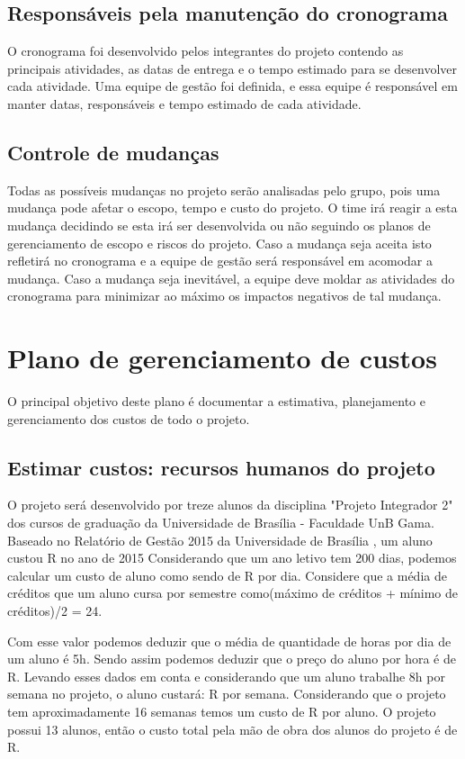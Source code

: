 \subsection{Responsáveis pela manutenção do cronograma}
O cronograma foi desenvolvido pelos integrantes do projeto contendo as principais atividades, as datas de entrega e o tempo estimado para se desenvolver cada atividade. Uma equipe de gestão foi definida, e essa equipe é responsável em manter datas, responsáveis e tempo estimado de cada atividade. 

\subsection{Controle de mudanças}
Todas as possíveis mudanças no projeto serão analisadas pelo grupo, pois uma mudança pode afetar o escopo, tempo e custo do projeto. O time irá reagir a esta mudança decidindo se esta irá ser desenvolvida ou não seguindo os planos de gerenciamento de escopo e riscos do projeto. Caso a mudança seja aceita isto refletirá no cronograma e a equipe de gestão será responsável em acomodar a mudança. Caso a mudança seja inevitável, a equipe deve moldar as atividades do cronograma para minimizar ao máximo os impactos negativos de tal mudança.


\section{Plano de gerenciamento de custos}

O principal objetivo deste plano é documentar a estimativa, planejamento e gerenciamento dos custos de todo o projeto.

\subsection{Estimar custos: recursos humanos do projeto} \label{subsec:custos_rh}

O projeto será desenvolvido por treze alunos da disciplina "Projeto Integrador 2" dos cursos de graduação da Universidade de Brasília - Faculdade UnB Gama. Baseado no Relatório de Gestão 2015 da Universidade de Brasília \cite{unb2015}, um aluno custou R no ano de 2015 Considerando que um ano letivo tem 200 dias, podemos calcular um custo de aluno como sendo de R por dia. Considere que a média de créditos que um aluno cursa por semestre como(máximo de créditos + mínimo de créditos)/2 = 24. 

Com esse valor podemos deduzir que o média de quantidade de horas por dia de um aluno é 5h. Sendo assim podemos deduzir que o preço do aluno por hora é de R.
Levando esses dados em conta e considerando que um aluno trabalhe 8h por semana no projeto, o aluno custará: R por semana.
Considerando que o projeto tem aproximadamente 16 semanas temos um custo de R por aluno. O projeto possui 13 alunos, então o custo total pela mão de obra dos alunos do projeto é de R.



